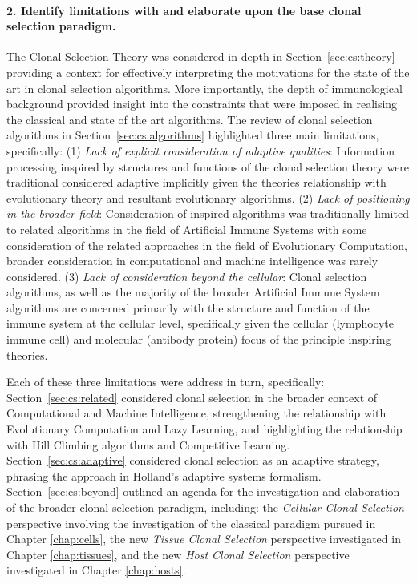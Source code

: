 \paragraph{2. Identify limitations with and elaborate upon the base clonal selection paradigm.}
The Clonal Selection Theory was considered in depth in Section~\ref{sec:cs:theory} providing a context for effectively interpreting the motivations for the state of the art in clonal selection algorithms. More importantly, the depth of immunological background provided insight into the constraints that were imposed in realising the classical and state of the art algorithms. 
The review of clonal selection algorithms in Section~\ref{sec:cs:algorithms} highlighted three main limitations, specifically: (1) \emph{Lack of explicit consideration of adaptive qualities}: Information processing inspired by structures and functions of the clonal selection theory were traditional considered adaptive implicitly given the theories relationship with evolutionary theory and resultant evolutionary algorithms. (2) \emph{Lack of positioning in the broader field}: Consideration of inspired algorithms was traditionally limited to related algorithms in the field of Artificial Immune Systems with some consideration of the related approaches in the field of Evolutionary Computation, broader consideration in computational and machine intelligence was rarely considered. (3) \emph{Lack of consideration beyond the cellular}: Clonal selection algorithms, as well as the majority of the broader Artificial Immune System algorithms are concerned primarily with the structure and function of the immune system at the cellular level, specifically given the cellular (lymphocyte immune cell) and molecular (antibody protein) focus of the principle inspiring theories.

Each of these three limitations were address in turn, specifically: Section~\ref{sec:cs:related} considered clonal selection in the broader context of Computational and Machine Intelligence, strengthening the relationship with Evolutionary Computation and Lazy Learning, and highlighting the relationship with Hill Climbing algorithms and Competitive Learning. Section~\ref{sec:cs:adaptive} considered clonal selection as an adaptive strategy, phrasing the approach in Holland's adaptive systems formalism.  Section~\ref{sec:cs:beyond} outlined an agenda for the investigation and elaboration of the broader clonal selection paradigm, including: the \emph{Cellular Clonal Selection} perspective involving the investigation of the classical paradigm pursued in Chapter \ref{chap:cells}, the new \emph{Tissue Clonal Selection} perspective investigated in Chapter \ref{chap:tissues}, and the new \emph{Host Clonal Selection} perspective investigated in Chapter \ref{chap:hosts}.

